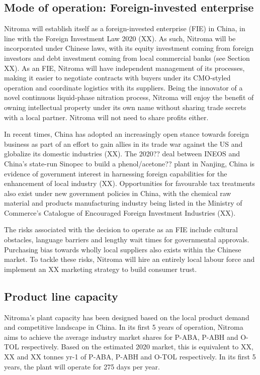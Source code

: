 \subsection{Mode of operation: Foreign-invested enterprise}
\label{sec:mode-of-operation}
Nitroma will establish itself as a foreign-invested enterprise (FIE) in China, in line with the Foreign Investment Law 2020 (XX). As such, Nitroma will be incorporated under Chinese laws, with its equity investment coming from foreign investors and debt investment coming from local commercial banks (see Section XX). As an FIE, Nitroma will have independent management of its processes, making it easier to negotiate contracts with buyers under its CMO-styled operation and coordinate logistics with its suppliers. Being the innovator of a novel continuous liquid-phase nitration process, Nitroma will enjoy the benefit of owning intellectual property under its own name without sharing trade secrets with a local partner. Nitroma will not need to share profits either. 

In recent times, China has adopted an increasingly open stance towards foreign business as part of an effort to gain allies in its trade war against the US and globalize its domestic industries (XX). The 2020?? deal between INEOS and China’s state-run Sinopec to build a phenol/acetone?? plant in Nanjing, China is evidence of government interest in harnessing foreign capabilities for the enhancement of local industry (XX). Opportunities for favourable tax treatments also exist under new government policies in China, with the chemical raw material and products manufacturing industry being listed in the Ministry of Commerce’s Catalogue of Encouraged Foreign Investment Industries (XX). 

The risks associated with the decision to operate as an FIE include cultural obstacles, language barriers and lengthy wait times for governmental approvals. Purchasing bias towards wholly local suppliers also exists within the Chinese market. To tackle these risks, Nitroma will hire an entirely local labour force and implement an XX marketing strategy to build consumer trust.


\subsection{Product line capacity}
\label{sec:product-capacity}
Nitroma’s plant capacity has been designed based on the local product demand and competitive landscape in China. In its first 5 years of operation, Nitroma aims to achieve the average industry market shares for P-ABA, P-ABH and O-TOL respectively. Based on the estimated 2020 market, this is equivalent to XX, XX and XX tonnes yr-1 of P-ABA, P-ABH and O-TOL respectively. In its first 5 years, the plant will operate for 275 days per year.


